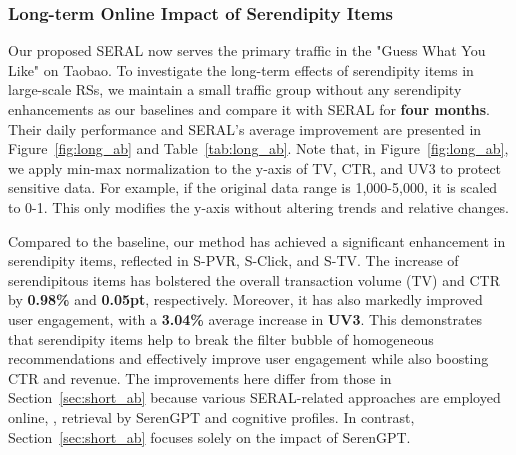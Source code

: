 \subsubsection{Long-term Online Impact of Serendipity Items}
Our proposed SERAL now serves the primary traffic in the "Guess What You Like" on Taobao. To investigate the long-term effects of serendipity items in large-scale RSs, we maintain a small traffic group without any serendipity enhancements as our baselines and compare it with SERAL for \textbf{four months}. Their daily performance and SERAL's average improvement are presented in Figure~\ref{fig:long_ab} and Table~\ref{tab:long_ab}. Note that, in Figure~\ref{fig:long_ab}, we apply min-max normalization to the y-axis of TV, CTR, and UV3 to protect sensitive data. For example, if the original data range is 1,000-5,000, it is scaled to 0-1. This only modifies the y-axis without altering trends and relative changes.

\begin{table}[h]
    \vspace{-10pt}
    \caption{Online improvement over non-serendipity baseline. }
    \vspace{-8pt}
    \centering
\label{tab:long_ab}
\vspace{-10pt}
\end{table}
Compared to the baseline, our method has achieved a significant enhancement in serendipity items, reflected in S-PVR, S-Click, and S-TV. The increase of serendipitous items has bolstered the overall transaction volume (TV) and CTR by \textbf{0.98\%} and \textbf{0.05pt}, respectively. Moreover, it has also markedly improved user engagement, with a \textbf{3.04\%} average increase in \textbf{UV3}. This demonstrates that serendipity items help to break the filter bubble of homogeneous recommendations and effectively improve user engagement while also boosting CTR and revenue. The improvements here differ from those in Section~\ref{sec:short_ab} because various SERAL-related approaches are employed online, \eg, retrieval by SerenGPT and cognitive profiles. In contrast, Section~\ref{sec:short_ab} focuses solely on the impact of SerenGPT.

